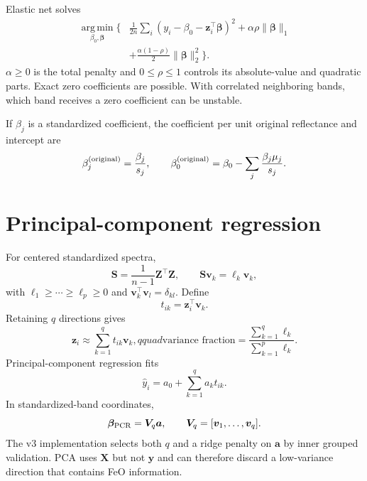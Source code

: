\documentclass[11pt]{article}
\newcommand{\argmin}{\operatorname*{arg\,min}}
\begin{document}
Elastic net solves
\begin{equation}
\begin{split}
 \argmin_{\beta_0,\bm\beta}\Bigg\{&\frac1{2n}
 \sum_i(y_i-\beta_0-\bm z_i^\top\bm\beta)^2
 +\alpha\rho\|\bm\beta\|_1\\
 &+\frac{\alpha(1-\rho)}2\|\bm\beta\|_2^2\Bigg\}.
\end{split}
\end{equation}
$\alpha\ge0$ is the total penalty and $0\le\rho\le1$ controls its absolute-value and quadratic parts. Exact zero coefficients are possible. With correlated neighboring bands, which band receives a zero coefficient can be unstable.

If $\beta_j$ is a standardized coefficient, the coefficient per unit original reflectance and intercept are
\begin{equation}
 \beta_j^{({\rm original})}=\frac{\beta_j}{s_j},\qquad
 \beta_0^{({\rm original})}=\beta_0-\sum_j\frac{\beta_j\mu_j}{s_j}.
\end{equation}

\section{Principal-component regression}
For centered standardized spectra,
\begin{equation}
 \bm S=\frac1{n-1}\bm Z^\top\bm Z,
 \qquad \bm S\bm v_k=\ell_k\bm v_k,
\end{equation}
with $\ell_1\ge\cdots\ge\ell_p\ge0$ and $\bm v_k^\top\bm v_l=\delta_{kl}$. Define
\begin{equation}
 t_{ik}=\bm z_i^\top\bm v_k.
\end{equation}
Retaining $q$ directions gives
\begin{equation}
 \bm z_i\approx\sum_{k=1}^{q}t_{ik}\bm v_k,qquad
 \text{variance fraction}=\frac{\sum_{k=1}^{q}\ell_k}{\sum_{k=1}^{p}\ell_k}.
\end{equation}
Principal-component regression fits
\begin{equation}
 \widehat y_i=a_0+\sum_{k=1}^{q}a_kt_{ik}.
\end{equation}
In standardized-band coordinates,
\begin{equation}
 \bm\beta_{\rm PCR}=\bm V_q\bm a,
 \qquad \bm V_q=[\bm v_1,\ldots,\bm v_q].
\end{equation}
The v3 implementation selects both $q$ and a ridge penalty on $\bm a$ by inner grouped validation. PCA uses $\bm X$ but not $\bm y$ and can therefore discard a low-variance direction that contains FeO information.
\end{document}
